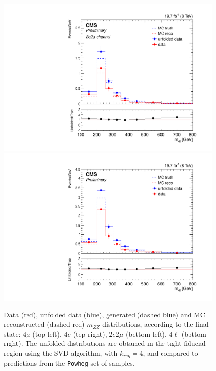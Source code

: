 \begin{figure}[hbtp]
\begin{center}
    \includegraphics[width=\cmsFigWidth]{Figures/Mass_ZZTo2e2m_Pow_fr_binwidth}  
    \includegraphics[width=\cmsFigWidth]{Figures/Mass_ZZTo4l_Pow_fr}    
    \caption{\footnotesize{Data (red), unfolded data (blue), generated (dashed blue) and MC reconstructed (dashed red) $m_{ZZ}$ distributions, according to the final state: 
$4\mu$ (top left), $4e$ (top right), $2e2\mu$  (bottom left),  $4\ell$ (bottom right). The unfolded distributions are obtained  in the tight fiducial region using the SVD algorithm, with $k_{reg} = 4$, and compared to predictions from the \texttt{Powheg} set of samples.}} 
    \label{fig:Mass_unfolding}
  \end{center}
\end{figure}


